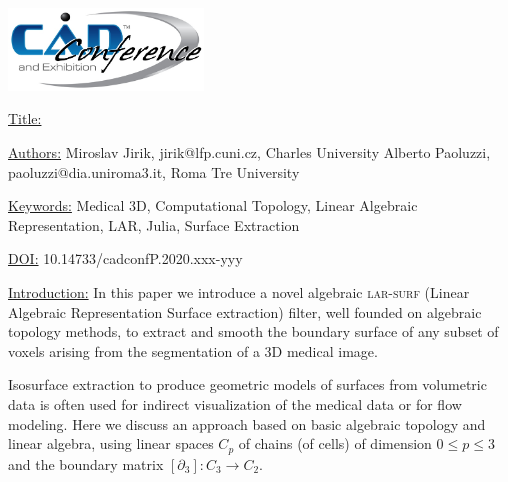 \documentclass{article}
\begin{document}
{\centering  \includegraphics[width=5.173cm,height=2.193cm]{images/CADconverted-img001.jpg} \par}

\vspace{5pt}
\noindent
\underline{Title:}


\vspace{1em}
\noindent \underline{Authors:}
\newline
Miroslav Jirik, jirik@lfp.cuni.cz, Charles University\newline
Alberto Paoluzzi, paoluzzi@dia.uniroma3.it, Roma Tre University

\vspace{1em}
\noindent \underline{Keywords:}\newline
Medical 3D, Computational Topology, Linear Algebraic Representation, LAR, Julia, Surface Extraction


\bigskip


\noindent \underline{DOI:} 10.14733/cadconfP.2020.xxx-yyy

\vspace{10pt}
\noindent\underline{Introduction:}\vspace{0.2em}\newline
In this paper we introduce a novel algebraic \textsc{lar-surf} (Linear Algebraic Representation Surface extraction) filter, well founded on algebraic topology methods, to extract and smooth the boundary surface of any subset of voxels arising from the segmentation of a 3D medical image.

Isosurface extraction to produce geometric models of surfaces from volumetric data 
is often used for indirect visualization of the medical data or for flow modeling. %
Here we discuss an approach based on basic algebraic topology and linear algebra, using linear spaces $C_p$ of chains (of cells) of dimension $0 \leq p \leq 3$ and the boundary matrix $[\partial_3] : C_3 \to C_2$.
\end{document}
